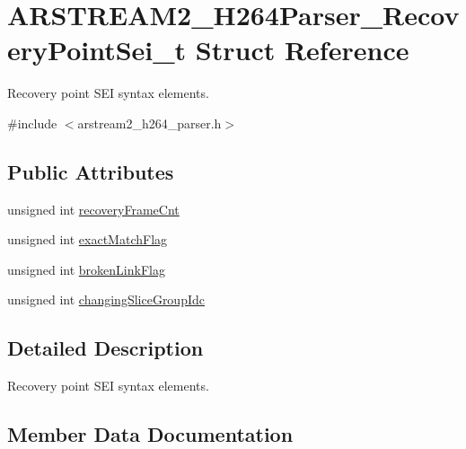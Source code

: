 \hypertarget{struct_a_r_s_t_r_e_a_m2___h264_parser___recovery_point_sei__t}{}\section{A\+R\+S\+T\+R\+E\+A\+M2\+\_\+\+H264\+Parser\+\_\+\+Recovery\+Point\+Sei\+\_\+t Struct Reference}
\label{struct_a_r_s_t_r_e_a_m2___h264_parser___recovery_point_sei__t}


Recovery point S\+EI syntax elements.  




{\ttfamily \#include $<$arstream2\+\_\+h264\+\_\+parser.\+h$>$}

\subsection*{Public Attributes}
\begin{DoxyCompactItemize}
\item 
unsigned int \hyperlink{struct_a_r_s_t_r_e_a_m2___h264_parser___recovery_point_sei__t_a271a4c6349624c0a66b60b419ad2703e}{recovery\+Frame\+Cnt}
\item 
unsigned int \hyperlink{struct_a_r_s_t_r_e_a_m2___h264_parser___recovery_point_sei__t_a210bc955d07da0c45456657ab26b4b8d}{exact\+Match\+Flag}
\item 
unsigned int \hyperlink{struct_a_r_s_t_r_e_a_m2___h264_parser___recovery_point_sei__t_a14a5417d0dffc8349c615e3ca1134122}{broken\+Link\+Flag}
\item 
unsigned int \hyperlink{struct_a_r_s_t_r_e_a_m2___h264_parser___recovery_point_sei__t_a8506af5a0c57bd4f00bbe183bd7a0bb5}{changing\+Slice\+Group\+Idc}
\end{DoxyCompactItemize}


\subsection{Detailed Description}
Recovery point S\+EI syntax elements. 

\subsection{Member Data Documentation}
